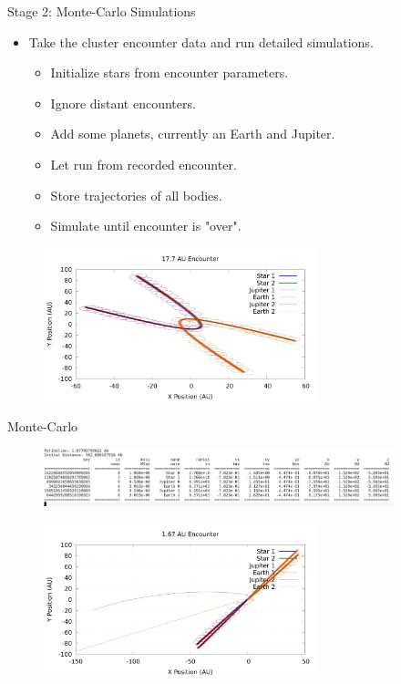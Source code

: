 \documentclass{beamer}
\begin{document}
\begin{frame}{Stage 2: Monte-Carlo Simulations}
    \begin{itemize}
        \item Take the cluster encounter data and run detailed simulations.
        \begin{itemize}
            \item Initialize stars from encounter parameters.
            \item Ignore distant encounters.
            \item Add some planets, currently an Earth and Jupiter.
            \item Let run from recorded encounter.
            \item Store trajectories of all bodies.
            \item Simulate until encounter is "over".
        \end{itemize}
    \end{itemize}
    \begin{figure}
        \centering
        \includegraphics[height=1.75in]{17_7_AU}
    \end{figure}
\end{frame}

\begin{frame}{Monte-Carlo}
    \begin{figure}
        \centering
        \includegraphics[width=4.00in]{Params.png}
    \end{figure}
    \begin{figure}
        \centering
        \includegraphics[height=1.75in]{ejection.png}
    \end{figure}
\end{frame}
\end{document}
